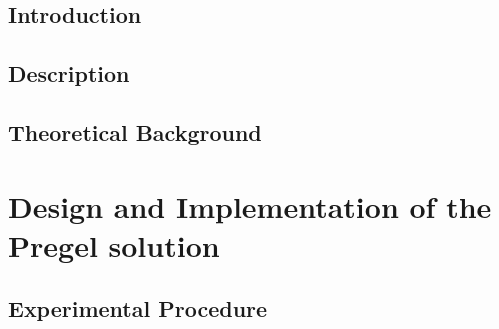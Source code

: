 \documentclass{legrand}
\begin{document}








\setcounter{page}{0}



\tableofcontents

\listoffigures

\listoftables


\chapter{Introduction}
\setcounter{page}{0} %
\label{chapter:intro}


\chapter{Description}
\label{chapter:description}


\chapter{Theoretical Background}
\label{chapter:theory}


\part{Design and Implementation of the Pregel solution}

\chapter{Experimental Procedure}
\label{chapter:experiment}

\end{document}
